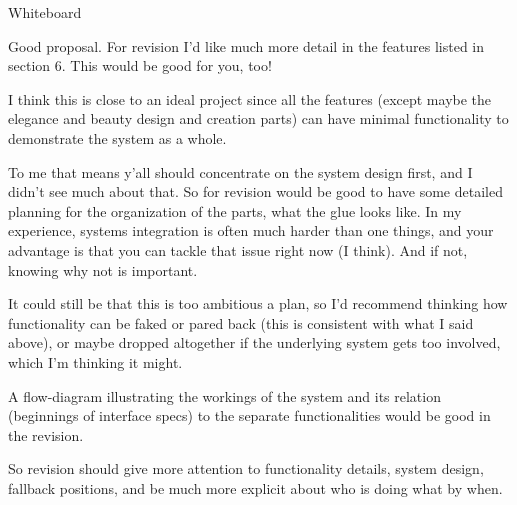 Whiteboard

Good proposal. For revision I'd like much more detail in the  features
listed in section 6.  This would be good for you, too!

I think this is close to an ideal project since all the features
(except maybe the elegance and beauty design and creation parts) can
have minimal functionality to demonstrate the system as a whole.

To me that means y'all should concentrate on the system design first,
and I didn't see much about that.  So for revision would be
good to have some detailed planning for the organization of the
parts, what the glue looks like.  In my experience, systems
integration
is often much harder than one things, and your advantage is that you
can tackle that issue right now (I think).  And if not, knowing why
not is important.

It could still be that this is too ambitious a plan, so I'd recommend
thinking how functionality can be faked or pared back (this is
consistent with what I said above), or maybe dropped altogether if
the underlying system gets too involved, which I'm thinking  it might.

A flow-diagram illustrating the workings of the system and its
relation (beginnings of interface specs) to the separate
functionalities
would be good in the revision.


So revision should give more attention to
functionality details, system design, fallback positions, and be
much more explicit about who is doing what by when.

